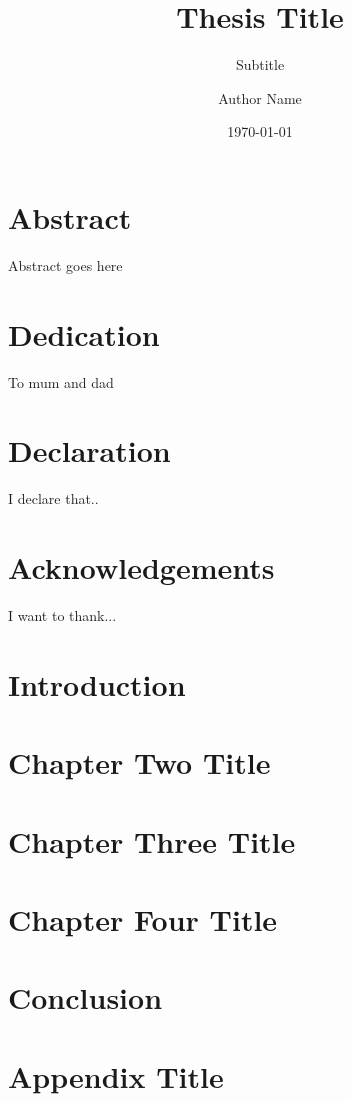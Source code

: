 \documentclass[12pt]{scrreprt}
\title{Thesis Title}
\subtitle{Subtitle}
\author{Author Name}
\date{\today}
\begin{document}


\chapter*{Abstract}
Abstract goes here

\chapter*{Dedication}
To mum and dad

\chapter*{Declaration}
I declare that..

\chapter*{Acknowledgements}
I want to thank...

\tableofcontents
\listoffigures
\listoftables

\chapter{Introduction}


\chapter{Chapter Two Title}


\chapter{Chapter Three Title}


\chapter{Chapter Four Title}


\chapter{Conclusion}



\printbibliography[heading=bibintoc]
% 

\appendix
\chapter{Appendix Title}

\end{document}
